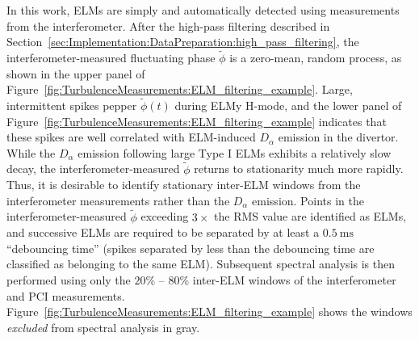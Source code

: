 In this work, ELMs are simply and automatically detected
using measurements from the interferometer.
After the high-pass filtering described in
Section~\ref{sec:Implementation:DataPreparation:high_pass_filtering},
the interferometer-measured fluctuating phase $\tilde{\phi}$
is a zero-mean, random process,
as shown in the upper panel of
Figure~\ref{fig:TurbulenceMeasurements:ELM_filtering_example}.
Large, intermittent spikes pepper $\tilde{\phi}(t)$ during ELMy H-mode, and
the lower panel of
Figure~\ref{fig:TurbulenceMeasurements:ELM_filtering_example}
indicates that these spikes are well correlated
with ELM-induced $D_{\alpha}$ emission in the divertor.
While the $D_{\alpha}$ emission following large Type I ELMs
exhibits a relatively slow decay,
the interferometer-measured $\tilde{\phi}$
returns to stationarity much more rapidly.
Thus, it is desirable to identify
stationary inter-ELM windows
from the interferometer measurements
rather than the $D_{\alpha}$ emission.
Points in the interferometer-measured $\tilde{\phi}$
exceeding $3 \times$ the RMS value
are identified as ELMs, and
successive ELMs are required to be separated
by at least a $\SI{0.5}{\milli\second}$ ``debouncing time''
(spikes separated by less than the debouncing time
are classified as belonging to the same ELM).
Subsequent spectral analysis is then performed
using only the $20\%$ -- $80\%$ inter-ELM windows
of the interferometer and PCI measurements.
Figure~\ref{fig:TurbulenceMeasurements:ELM_filtering_example}
shows the windows \emph{excluded} from spectral analysis in gray.


